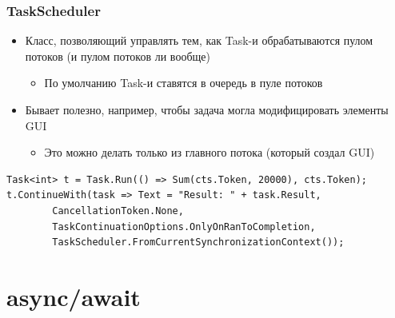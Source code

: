 \documentclass{../../slides-style}
\begin{document}
    \begin{frame}[fragile]
        \frametitle{TaskScheduler}
        \begin{itemize}
            \item Класс, позволяющий управлять тем, как Task-и обрабатываются пулом потоков (и пулом потоков ли вообще)
            \begin{itemize}
                \item По умолчанию Task-и ставятся в очередь в пуле потоков
            \end{itemize}
            \item Бывает полезно, например, чтобы задача могла модифицировать элементы GUI
            \begin{itemize}
                \item Это можно делать только из главного потока (который создал GUI)
            \end{itemize}
        \end{itemize}

        \begin{small}
            \begin{verbatim}
Task<int> t = Task.Run(() => Sum(cts.Token, 20000), cts.Token);
t.ContinueWith(task => Text = "Result: " + task.Result,
        CancellationToken.None,
        TaskContinuationOptions.OnlyOnRanToCompletion,
        TaskScheduler.FromCurrentSynchronizationContext());
            \end{verbatim}
        \end{small}
    \end{frame}

    \section{async/await}
\end{document}
